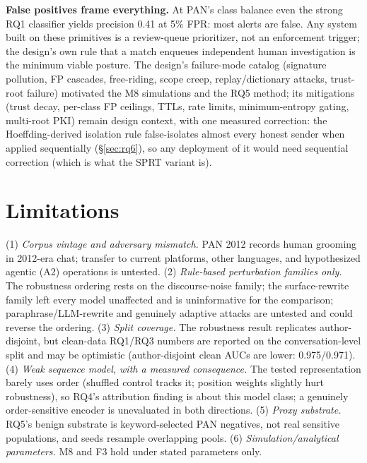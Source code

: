 \documentclass[letterpaper,twocolumn,10pt]{article}
\begin{document}
\textbf{False positives frame everything.} At PAN's class balance even the
strong RQ1 classifier yields precision 0.41 at 5\% FPR: most alerts are
false. Any system built on these primitives is a review-queue prioritizer,
not an enforcement trigger; the design's own rule that a match enqueues
independent human investigation is the minimum viable posture. The design's
failure-mode catalog (signature pollution, FP cascades, free-riding, scope
creep, replay/dictionary attacks, trust-root failure) motivated the M8
simulations and the RQ5 method; its mitigations (trust decay, per-class
FP ceilings, TTLs, rate limits, minimum-entropy gating, multi-root PKI)
remain design context, with one measured correction: the Hoeffding-derived
isolation rule false-isolates almost every honest sender when applied
sequentially (\S\ref{sec:rq6}), so any deployment of it would need
sequential correction (which is what the SPRT variant is).

\section{Limitations}
\label{sec:limitations}
(1) \emph{Corpus vintage and adversary mismatch.} PAN 2012 records human
grooming in 2012-era chat; transfer to current platforms, other languages,
and hypothesized agentic (A2) operations is untested. (2) \emph{Rule-based
perturbation families only.} The robustness ordering rests on the
discourse-noise family; the surface-rewrite family left every model
unaffected and is uninformative for the comparison; paraphrase/LLM-rewrite
and genuinely adaptive attacks are untested and could reverse the ordering.
(3) \emph{Split coverage.} The robustness result replicates author-disjoint,
but clean-data RQ1/RQ3 numbers are reported on the conversation-level split
and may be optimistic (author-disjoint clean AUCs are lower: 0.975/0.971).
(4) \emph{Weak sequence model, with a measured consequence.} The tested
representation barely uses order (shuffled control tracks it; position
weights slightly hurt robustness), so RQ4's attribution finding is about
this model class; a genuinely order-sensitive encoder is unevaluated in both
directions. (5) \emph{Proxy substrate.} RQ5's benign substrate is
keyword-selected PAN negatives, not real sensitive populations, and seeds
resample overlapping pools. (6) \emph{Simulation/analytical parameters.}
M8 and F3 hold under stated parameters only.

\end{document}

